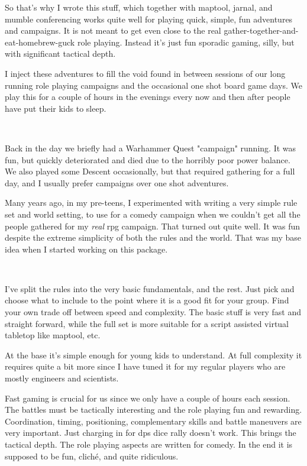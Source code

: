 \documentclass[11pt, twoside, titlepage, a4paper]{report}
\begin{document}
So that's why I wrote this stuff, which together with maptool, jarnal, and mumble conferencing works quite well for playing quick, simple, fun adventures and campaigns. It is not meant to get even close to the real gather-together-and-eat-homebrew-guck role playing. Instead it's just fun sporadic gaming, silly, but with significant tactical depth.

I inject these adventures to fill the void found in between sessions of our long running role playing campaigns and the occasional one shot board game days.
We play this for a couple of hours in the evenings every now and then after people have put their kids to sleep.

\

Back in the day we briefly had a Warhammer Quest "campaign" running. It was fun, but quickly deteriorated and died due to the horribly poor power balance. We also played some Descent occasionally, but that required gathering for a full day, and I usually prefer campaigns over one shot adventures.

Many years ago, in my pre-teens, I experimented with writing a very simple rule set and world setting, to use for a comedy campaign when we couldn't get all the people gathered for my \emph{real} rpg campaign. That turned out quite well. It was fun despite the extreme simplicity of both the rules and the world. That was my base idea when I started working on this package.

\

I've split the rules into the very basic fundamentals, and the rest. Just pick and choose what to include to the point where it is a good fit for your group. Find your own trade off between speed and complexity. The basic stuff is very fast and straight forward, while the full set is more suitable for a script assisted virtual tabletop like maptool, etc.

At the base it's simple enough for young kids to understand. At full complexity it requires quite a bit more since I have tuned it for my regular players who are mostly engineers and scientists.

Fast gaming is crucial for us since we only have a couple of hours each session. The battles must be tactically interesting and the role playing fun and rewarding. Coordination, timing, positioning, complementary skills and battle maneuvers are very important. Just charging in for dps dice rally doesn't work. This brings the tactical depth. The role playing aspects are written for comedy. In the end it is supposed to be fun, cliché, and quite ridiculous.
\end{document}

